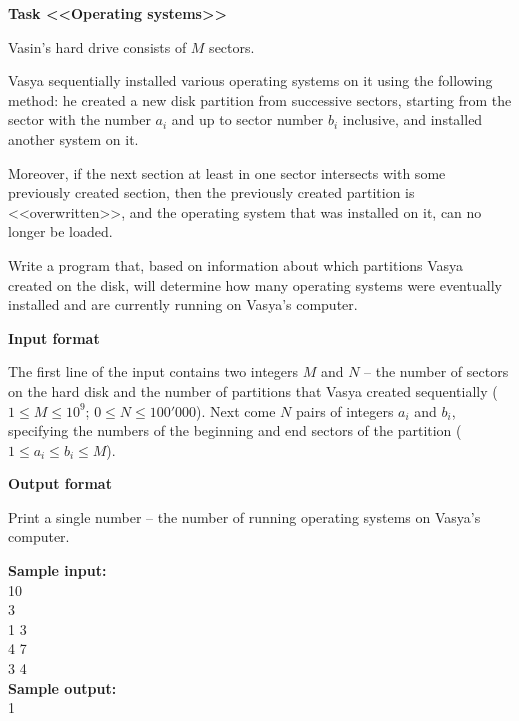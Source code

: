 \documentclass[a4paper]{article}
\begin{document}
\textbf{Task <<Operating systems>>}

Vasin's hard drive consists of $M$ sectors.

Vasya sequentially installed various operating systems on it using the following method: he created a new disk partition from successive sectors, starting from the sector with the number $a_i$ and up to sector number $b_i$ inclusive, and installed another system on it.

Moreover, if the next section at least in one sector intersects with some previously created section,
then the previously created partition is <<overwritten>>, and the operating system that was installed on it,
can no longer be loaded.

Write a program that, based on information about which partitions Vasya created on the disk, will determine how many operating systems were eventually installed and are currently running on Vasya's computer.

\SPACE

\textbf{Input format}

The first line of the input contains two integers $M$ and $N$ -- the number of sectors on the hard disk and the number of partitions that Vasya created sequentially ($1 \le M \le 10^9$; $0 \le N \le 100'000$). Next come $N$ pairs of integers $a_i$ and $b_i$, specifying the numbers of the beginning and end sectors of the partition ($1 \le a_i \le b_i \le M$).

\SPACE

\textbf{Output format}

Print a single number -- the number of running operating systems on Vasya's computer.

\LINE

\noindent \textbf{Sample input:}\\
10\\
3\\
1 3\\
4 7\\
3 4\\

\noindent \textbf{Sample output:}\\
1\\
\end{document}
